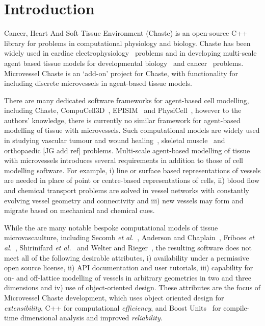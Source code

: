 \documentclass[10pt,letterpaper]{article}
\begin{document}
\linenumbers

\section*{Introduction}
Cancer, Heart And Soft Tissue Environment (Chaste) is an open-source C++ library for problems in computational physiology and biology. Chaste has been widely used in cardiac electrophysiology~\cite{Cooper2015} problems and in developing multi-scale agent based tissue models for developmental biology~\cite{Tetley2016} and cancer~\cite{Dunn2016} problems. Microvessel Chaste is an `add-on' project for Chaste, with functionality for including discrete microvessels in agent-based tissue models.

There are many dedicated software frameworks for agent-based cell modelling, including Chaste, CompuCell3D~\cite{Swat2012}, EPISIM~\cite{Sutterlin2013} and PhysiCell~\cite{Macklin2012}, however to the authors' knowledge, there is currently no similar framework for agent-based modelling of tissue with microvessels. Such computational models are widely used in studying vascular tumour and wound healing~\cite{Owen2011}, skeletal muscle~\cite{Secomb2004} and orthopaedic [JG add ref] problems. Multi-scale agent-based modelling of tissue with microvessels introduces several requirements in addition to those of cell modelling software. For example, i) line or surface based representations of vessels are needed in place of point or centre-based representations of cells, ii) blood flow and chemical transport problems are solved in vessel networks with constantly evolving vessel geometry and connectivity and iii) new vessels may form and migrate based on mechanical and chemical cues. 

While the are many notable bespoke computational models of tissue microvascaulture, including Secomb \emph{et al.}~\cite{Secomb2013}, Anderson and Chaplain~\cite{Anderson1998}, Friboes \emph{et al.}~\cite{Frieboes2007}, Shirinifard \emph{et al.}~\cite{Shirinifard2009} and Welter and Rieger~\cite{Welter2013}, the resulting software does not meet all of the following desirable attributes, i) availability under a permissive open source license, ii) API documentation and user tutorials, iii) capability for on- and off-lattice modelling of vessels in arbitrary geometries in two and three dimensions and iv) use of object-oriented design. These attributes are the focus of Microvessel Chaste development, which uses object oriented design for \emph{extensibility}, C++ for computational \emph{efficiency}, and Boost Units~\cite{boost161} for compile-time dimensional analysis and improved \emph{reliability}. 
\end{document}
